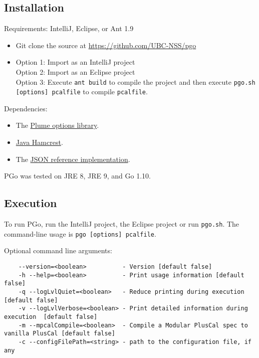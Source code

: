 \subsection{Installation}
Requirements: IntelliJ, Eclipse, or Ant 1.9

\begin{itemize}
\item Git clone the source at \url{https://github.com/UBC-NSS/pgo}

\item Option 1: Import as an IntelliJ project \\
Option 2: Import as an Eclipse project \\
Option 3: Execute \texttt{ant build} to compile the project and then execute \texttt{pgo.sh [options] pcalfile} to compile \texttt{pcalfile}.
\end{itemize}

Dependencies:
\begin{itemize}
\item The \href{https://mernst.github.io/plume-lib/}
	{Plume options library}.

\item \href{http://hamcrest.org/JavaHamcrest/}
	{Java Hamcrest}.

\item The \href{https://github.com/stleary/JSON-java}
	{JSON reference implementation}.
\end{itemize}


PGo was tested on JRE 8, JRE 9, and Go 1.10.

\subsection{Execution}
To run PGo, run the IntelliJ project, the Eclipse project or run \texttt{pgo.sh}. The command-line usage is \texttt{pgo [options] pcalfile}.

Optional command line arguments:

\begin{verbatim}
	--version=<boolean>          - Version [default false]
	-h --help=<boolean>          - Print usage information [default false]
	-q --logLvlQuiet=<boolean>   - Reduce printing during execution [default false]
	-v --logLvlVerbose=<boolean> - Print detailed information during execution  [default false]
	-m --mpcalCompile=<boolean>  - Compile a Modular PlusCal spec to vanilla PlusCal [default false]
	-c --configFilePath=<string> - path to the configuration file, if any
\end{verbatim}

